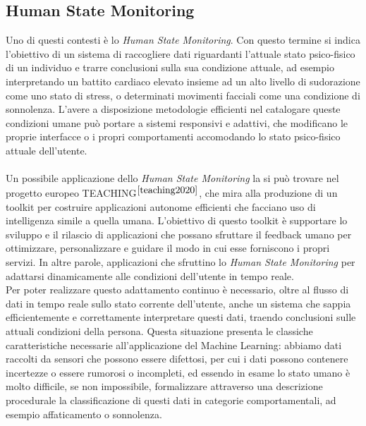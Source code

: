 \subsection{Human State Monitoring}
Uno di questi contesti è lo \textit{Human State Monitoring}. Con questo termine si indica l'obiettivo di un sistema di raccogliere dati riguardanti l'attuale stato psico-fisico di un individuo e trarre conclusioni sulla sua condizione attuale, ad esempio interpretando un battito cardiaco elevato insieme ad un alto livello di sudorazione come uno stato di stress, o determinati movimenti facciali come una condizione di sonnolenza. L'avere a disposizione metodologie efficienti nel catalogare queste condizioni umane può portare a sistemi responsivi e adattivi, che modificano le proprie interfacce o i propri comportamenti accomodando lo stato psico-fisico attuale dell'utente.\\\\
Un possibile applicazione dello \textit{Human State Monitoring} la si può trovare nel progetto europeo TEACHING$^{\cite{teaching2020}}$, che mira alla produzione di un toolkit per costruire applicazioni autonome efficienti che facciano uso di intelligenza simile a quella umana. L'obiettivo di questo toolkit è supportare lo sviluppo e il rilascio di applicazioni che possano sfruttare il feedback umano per ottimizzare, personalizzare e guidare il modo in cui esse forniscono i propri servizi. In altre parole, applicazioni che sfruttino lo \textit{Human State Monitoring} per adattarsi dinamicamente alle condizioni dell'utente in tempo reale.\\
Per poter realizzare questo adattamento continuo è necessario, oltre al flusso di dati in tempo reale sullo stato corrente dell'utente, anche un sistema che sappia efficientemente e correttamente interpretare questi dati, traendo conclusioni sulle attuali condizioni della persona. Questa situazione presenta le classiche caratteristiche necessarie all'applicazione del Machine Learning: abbiamo dati raccolti da sensori che possono essere difettosi, per cui i dati possono contenere incertezze o essere rumorosi o incompleti, ed essendo in esame lo stato umano è molto difficile, se non impossibile, formalizzare attraverso una descrizione procedurale la classificazione di questi dati in categorie comportamentali, ad esempio affaticamento o sonnolenza.

